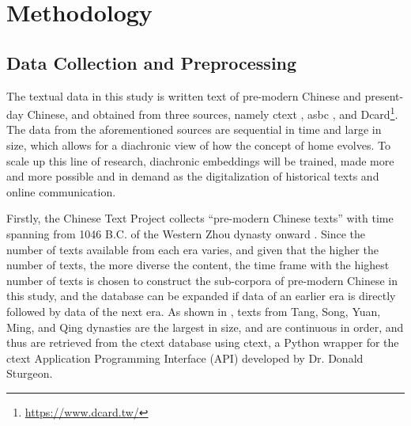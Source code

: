 

\chapter{Methodology}

\section{Data Collection and Preprocessing}
The textual data in this study is written text of pre-modern Chinese and present-day Chinese, and obtained from three sources, namely \gls{ctext} \parencite{sturgeon2019ctext}, \gls{asbc} \parencite{chen1996sinica}, and Dcard\footnote{\url{https://www.dcard.tw/}}. The data from the aforementioned sources are sequential in time and large in size, which allows for a diachronic view of how the concept of home evolves. To scale up this line of research, diachronic embeddings will be trained, made more and more possible and in demand as the digitalization of historical texts and online communication.

Firstly, the Chinese Text Project collects ``pre-modern Chinese texts'' with time spanning from 1046 B.C. of the Western Zhou dynasty onward \parencite{sturgeon2019ctext}. Since the number of texts available from each era varies, and given that the higher the number of texts, the more diverse the content, the time frame with the highest number of texts is chosen to construct the sub-corpora of pre-modern Chinese in this study, and the database can be expanded if data of an earlier era is directly followed by data of the next era. As shown in , texts from Tang, Song, Yuan, Ming, and Qing dynasties are the largest in size, and are continuous in order, and thus are retrieved from the \gls{ctext} database using ctext, a Python wrapper for the \gls{ctext} Application Programming Interface (API) developed by Dr. Donald Sturgeon.

